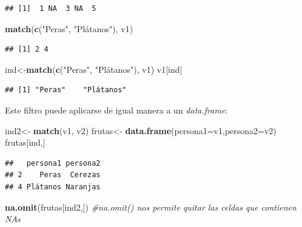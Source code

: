 \documentclass[
]{book}
\newenvironment{Shaded}{\begin{snugshade}}{\end{snugshade}}
\newcommand{\AttributeTok}[1]{\textcolor[rgb]{0.13,0.29,0.53}{#1}}
\newcommand{\CommentTok}[1]{\textcolor[rgb]{0.56,0.35,0.01}{\textit{#1}}}
\newcommand{\FunctionTok}[1]{\textcolor[rgb]{0.13,0.29,0.53}{\textbf{#1}}}
\newcommand{\NormalTok}[1]{#1}
\newcommand{\OtherTok}[1]{\textcolor[rgb]{0.56,0.35,0.01}{#1}}
\newcommand{\StringTok}[1]{\textcolor[rgb]{0.31,0.60,0.02}{#1}}
\begin{document}
\begin{verbatim}
## [1]  1 NA  3 NA  5
\end{verbatim}

\begin{Shaded}
\begin{Highlighting}[]
\FunctionTok{match}\NormalTok{(}\FunctionTok{c}\NormalTok{(}\StringTok{"Peras"}\NormalTok{, }\StringTok{"Plátanos"}\NormalTok{), v1)}
\end{Highlighting}
\end{Shaded}

\begin{verbatim}
## [1] 2 4
\end{verbatim}

\begin{Shaded}
\begin{Highlighting}[]
\NormalTok{ind}\OtherTok{\textless{}{-}}\FunctionTok{match}\NormalTok{(}\FunctionTok{c}\NormalTok{(}\StringTok{"Peras"}\NormalTok{, }\StringTok{"Plátanos"}\NormalTok{), v1)}
\NormalTok{v1[ind]}
\end{Highlighting}
\end{Shaded}

\begin{verbatim}
## [1] "Peras"    "Plátanos"
\end{verbatim}

Este filtro puede aplicarse de igual manera a un \emph{data.frame}:

\begin{Shaded}
\begin{Highlighting}[]
\NormalTok{ind2}\OtherTok{\textless{}{-}} \FunctionTok{match}\NormalTok{(v1, v2)}
\NormalTok{frutas}\OtherTok{\textless{}{-}} \FunctionTok{data.frame}\NormalTok{(}\AttributeTok{persona1=}\NormalTok{v1,}\AttributeTok{persona2=}\NormalTok{v2)}
\NormalTok{frutas[ind,]}
\end{Highlighting}
\end{Shaded}

\begin{verbatim}
##   persona1 persona2
## 2    Peras  Cerezas
## 4 Plátanos Naranjas
\end{verbatim}

\begin{Shaded}
\begin{Highlighting}[]
\FunctionTok{na.omit}\NormalTok{(frutas[ind2,])     }\CommentTok{\#na.omit() nos permite quitar las celdas que contienen NA\textquotesingle{}s}
\end{Highlighting}
\end{Shaded}
\end{document}
